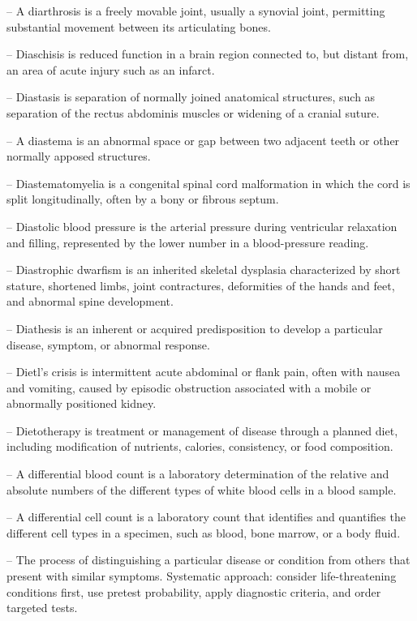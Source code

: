 -- A diarthrosis is a freely movable joint, usually a synovial joint, permitting substantial movement between its articulating bones.

-- Diaschisis is reduced function in a brain region connected to, but distant from, an area of acute injury such as an infarct.

-- Diastasis is separation of normally joined anatomical structures, such as separation of the rectus abdominis muscles or widening of a cranial suture.

-- A diastema is an abnormal space or gap between two adjacent teeth or other normally apposed structures.

-- Diastematomyelia is a congenital spinal cord malformation in which the cord is split longitudinally, often by a bony or fibrous septum.

-- Diastolic blood pressure is the arterial pressure during ventricular relaxation and filling, represented by the lower number in a blood-pressure reading.

-- Diastrophic dwarfism is an inherited skeletal dysplasia characterized by short stature, shortened limbs, joint contractures, deformities of the hands and feet, and abnormal spine development.

-- Diathesis is an inherent or acquired predisposition to develop a particular disease, symptom, or abnormal response.

-- Dietl's crisis is intermittent acute abdominal or flank pain, often with nausea and vomiting, caused by episodic obstruction associated with a mobile or abnormally positioned kidney.

-- Dietotherapy is treatment or management of disease through a planned diet, including modification of nutrients, calories, consistency, or food composition.

-- A differential blood count is a laboratory determination of the relative and absolute numbers of the different types of white blood cells in a blood sample.

-- A differential cell count is a laboratory count that identifies and quantifies the different cell types in a specimen, such as blood, bone marrow, or a body fluid.

-- The process of distinguishing a particular disease or condition from others that present with similar symptoms. Systematic approach: consider life-threatening conditions first, use pretest probability, apply diagnostic criteria, and order targeted tests.

